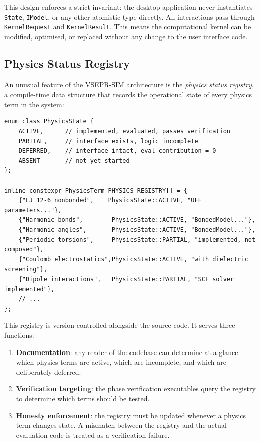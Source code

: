 \documentclass[11pt,twoside]{article}
\newcommand{\type}[1]{\texttt{#1}}
\begin{document}
This design enforces a strict invariant: the desktop application never instantiates \type{State}, \type{IModel}, or any other atomistic type directly. All interactions pass through \type{KernelRequest} and \type{KernelResult}. This means the computational kernel can be modified, optimised, or replaced without any change to the user interface code.

\subsection{Physics Status Registry}
\label{sec:physics-registry}

An unusual feature of the VSEPR-SIM architecture is the \emph{physics status registry}, a compile-time data structure that records the operational state of every physics term in the system:

\begin{lstlisting}
enum class PhysicsState {
    ACTIVE,      // implemented, evaluated, passes verification
    PARTIAL,     // interface exists, logic incomplete
    DEFERRED,    // interface intact, eval contribution = 0
    ABSENT       // not yet started
};

inline constexpr PhysicsTerm PHYSICS_REGISTRY[] = {
    {"LJ 12-6 nonbonded",    PhysicsState::ACTIVE, "UFF parameters..."},
    {"Harmonic bonds",        PhysicsState::ACTIVE, "BondedModel..."},
    {"Harmonic angles",       PhysicsState::ACTIVE, "BondedModel..."},
    {"Periodic torsions",     PhysicsState::PARTIAL, "implemented, not composed"},
    {"Coulomb electrostatics",PhysicsState::ACTIVE, "with dielectric screening"},
    {"Dipole interactions",   PhysicsState::PARTIAL, "SCF solver implemented"},
    // ...
};
\end{lstlisting}

This registry is version-controlled alongside the source code. It serves three functions:

\begin{enumerate}
  \item \textbf{Documentation}: any reader of the codebase can determine at a glance which physics terms are active, which are incomplete, and which are deliberately deferred.
  \item \textbf{Verification targeting}: the phase verification executables query the registry to determine which terms should be tested.
  \item \textbf{Honesty enforcement}: the registry must be updated whenever a physics term changes state. A mismatch between the registry and the actual evaluation code is treated as a verification failure.
\end{enumerate}
\end{document}
